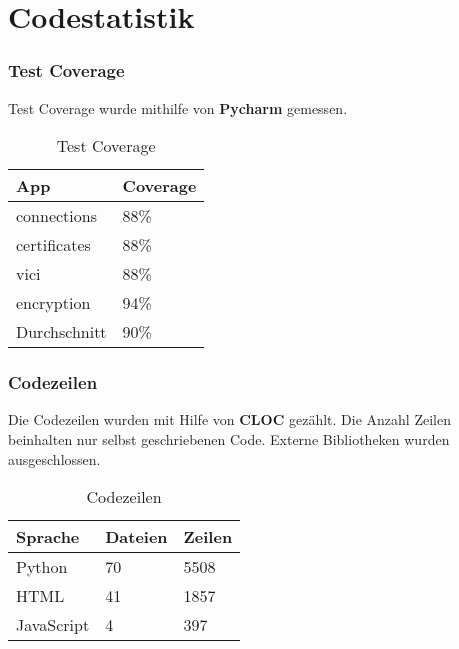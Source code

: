 \section{Codestatistik}
\subsubsection{Test Coverage}
Test Coverage wurde mithilfe von \textbf{Pycharm} gemessen. \\

\begin{table}[H]
\centering
    \begin{tabular}{|p{6cm}|p{6cm}|}
    \hline    
    \rowcolor{lightblue}
	App & Coverage \\ \hline
	connections & 88\% \\ \hline    
	certificates & 88\% \\ \hline   
	vici & 88\% \\ \hline  
	encryption & 94\% \\ \hline  
	\rowcolor{lightblue}
	Durchschnitt &   90\% \\ \hline
    \end{tabular}
    \caption[Test Coverage]{Test Coverage}
\end{table}

\subsubsection{Codezeilen}
Die Codezeilen wurden mit Hilfe von \textbf{CLOC} \cite{CLOC} gezählt. Die Anzahl Zeilen beinhalten nur selbst geschriebenen Code. Externe Bibliotheken wurden ausgeschlossen. \\

\begin{table}[H]
\centering
    \begin{tabular}{|p{3cm} |p{3cm} |p{3cm} |}
    \hline    
    \rowcolor{lightblue}
	Sprache & Dateien & Zeilen  \\ \hline   
	Python & 70 & 5508 \\ \hline
	HTML & 41 & 1857 \\ \hline
	JavaScript & 4 & 397 \\ \hline
    \end{tabular}
    \caption[Codezeilen]{Codezeilen}
\end{table}

